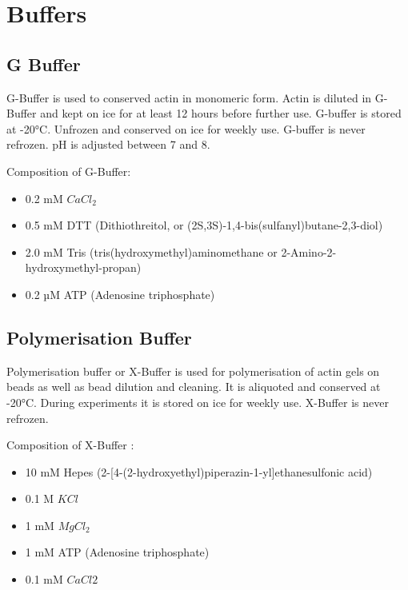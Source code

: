 \documentclass[A4paperpaper,11pt,english]{sphinxmanual}
\begin{document}
\section{Buffers}
\label{parts/part2:buffers}

\subsection{G Buffer}
\label{parts/part2:g-buffer}
G-Buffer is used to conserved actin in monomeric form. Actin is diluted in
G-Buffer and kept on ice for at least 12 hours before further use. G-buffer is
stored at -20°C. Unfrozen and conserved on ice for weekly use. G-buffer is never
refrozen.  pH is adjusted between 7 and 8.

Composition of G-Buffer:
\begin{itemize}
\item {} 
0.2 mM \(CaCl_2\)

\item {} 
0.5 mM DTT (Dithiothreitol, or (2S,3S)-1,4-bis(sulfanyl)butane-2,3-diol)

\item {} 
2.0 mM Tris (tris(hydroxymethyl)aminomethane or 2-Amino-2-hydroxymethyl-propan)

\item {} 
0.2 µM ATP (Adenosine triphosphate)

\end{itemize}


\subsection{Polymerisation Buffer}
\label{parts/part2:polymerisation-buffer}
Polymerisation buffer or X-Buffer is used for polymerisation of actin gels on
beads  as well as bead dilution and cleaning.  It is aliquoted and conserved at
-20°C. During experiments it is stored on ice for weekly use. X-Buffer is never
refrozen.

Composition of X-Buffer :
\begin{itemize}
\item {} 
10 mM Hepes (2-{[}4-(2-hydroxyethyl)piperazin-1-yl{]}ethanesulfonic acid)

\item {} 
0.1 M \(KCl\)

\item {} 
1 mM \(MgCl_2\)

\item {} 
1 mM ATP (Adenosine triphosphate)

\item {} 
0.1 mM \(CaCl2\)

\end{itemize}
\end{document}

